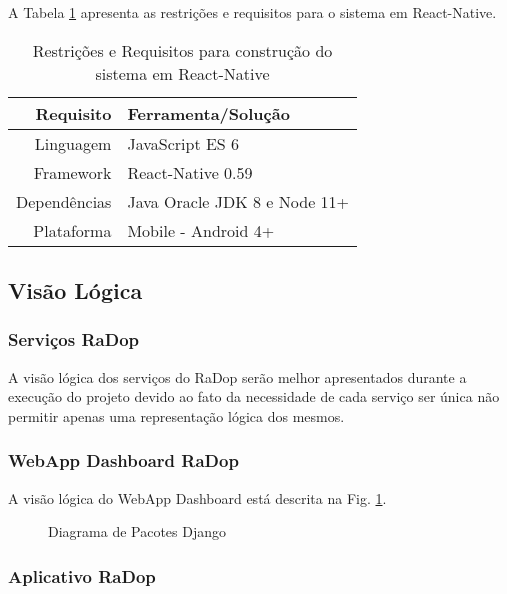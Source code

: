 A Tabela \ref{tab:app} apresenta as restrições e requisitos para o sistema em React-Native.

\begin{table}[h]
\centering
\caption{Restrições e Requisitos para construção do sistema em React-Native}
\label{tab:app}
  \begin{tabular}{|r|l|}
  \hline
  \textbf{Requisito} & \textbf{Ferramenta/Solução}  \\ \hline
  Linguagem          & JavaScript ES 6              \\ \hline
  Framework          & React-Native 0.59            \\ \hline
  Dependências       & Java Oracle JDK 8 e Node 11+ \\ \hline
  Plataforma         & Mobile - Android 4+          \\ \hline
  \end{tabular}
\end{table}

\subsection{Visão Lógica}\label{visao-logica}

\subsubsection{Serviços RaDop}\label{servicos-radop}

A visão lógica dos serviços do RaDop serão melhor apresentados durante a
execução do projeto devido ao fato da necessidade de cada serviço ser
única não permitir apenas uma representação lógica dos mesmos.

\subsubsection{WebApp Dashboard RaDop}\label{visao-webapp-dashboard-radop}

A visão lógica do WebApp Dashboard está descrita na Fig. \ref{fig:diagrama-pact-django}.

\begin{figure}[!htb]
    \caption{\label{fig:diagrama-pact-django} Diagrama de Pacotes Django}
\end{figure}
\pagebreak
\subsubsection{Aplicativo RaDop}\label{visao-aplicativo-radop}

